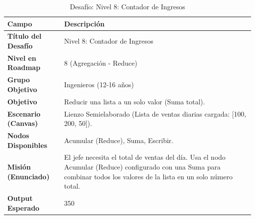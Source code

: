 \begin{table}[H]
    \centering
    \caption{Desafío: Nivel 8: Contador de Ingresos}
    \label{tab:desafio-ing-8}
    \begingroup
    \renewcommand{\arraystretch}{\TableRowStretch}
    \begin{tabularx}{\textwidth}{ l X }
        \hline
        \textbf{Campo}              & \textbf{Descripción}                                                                                                                                                     \\
        \hline
        \textbf{Título del Desafío} & Nivel 8: Contador de Ingresos                                                                                                                                            \\
        \textbf{Nivel en Roadmap}   & 8 (Agregación - Reduce)                                                                                                                                                  \\
        \textbf{Grupo Objetivo}     & Ingenieros (12-16 años)                                                                                                                                                  \\
        \textbf{Objetivo}           & Reducir una lista a un solo valor (Suma total).                                                                                                                          \\
        \textbf{Escenario (Canvas)} & Lienzo Semielaborado (Lista de ventas diarias cargada: [100, 200, 50]).                                                                                                  \\
        \textbf{Nodos Disponibles}  & Acumular (Reduce), Suma, Escribir.                                                                                                                                       \\
        \textbf{Misión (Enunciado)} & El jefe necesita el total de ventas del día. Usa el nodo Acumular (Reduce) configurado con una Suma para combinar todos los valores de la lista en un solo número total. \\
        \textbf{Output Esperado}    & 350                                                                                                                                                                      \\
        \hline
    \end{tabularx}
    \endgroup
\end{table}

